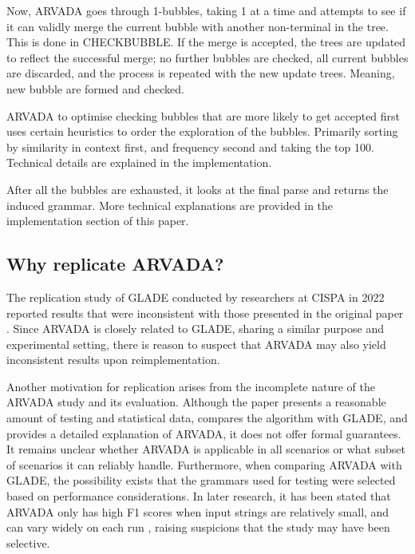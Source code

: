 Now, ARVADA goes through 1-bubbles, taking 1 at a time and attempts to see if it can validly merge the current bubble with another non-terminal in the tree. This is done in CHECKBUBBLE. If the merge is accepted, the trees are updated to reflect the successful merge; no further bubbles are checked, all current bubbles are discarded, and the process is repeated with the new update trees. Meaning, new bubble are formed and checked. 

\vspace{\baselineskip}
ARVADA to optimise checking bubbles that are more likely to get accepted first uses certain heuristics to order the exploration of the bubbles. Primarily sorting by similarity in context first, and frequency second and taking the top 100. Technical details are explained in the implementation.

\vspace{\baselineskip}
After all the bubbles are exhausted, it looks at the final parse and returns the induced grammar. More technical explanations are provided in the implementation section of this paper.


\subsection{Why replicate ARVADA?}
The replication study of GLADE \cite{bastaniSynthesizingProgramInput} conducted by researchers at CISPA \cite{bendrissouSynthesizingInputGrammars2022} in 2022 reported results that were inconsistent with those presented in the original paper \cite{bastaniSynthesizingProgramInput}. Since ARVADA is closely related to GLADE, sharing a similar purpose and experimental setting, there is reason to suspect that ARVADA may also yield inconsistent results upon reimplementation.

\vspace{\baselineskip}

Another motivation for replication arises from the incomplete nature of the ARVADA study and its evaluation. Although the paper presents a reasonable amount of testing and statistical data, compares the algorithm with GLADE, and provides a detailed explanation of ARVADA, it does not offer formal guarantees. It remains unclear whether ARVADA is applicable in all scenarios or what subset of scenarios it can reliably handle. Furthermore, when comparing ARVADA with GLADE, the possibility exists that the grammars used for testing were selected based on performance considerations. In later research, it has been stated that ARVADA only has high F1 scores when input strings are relatively small, and can vary widely on each run \cite{arefinFastDeterministicBlackbox2024}, raising suspicions that the study may have been selective.

